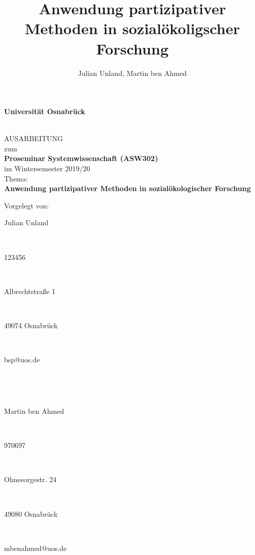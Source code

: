 \documentclass[a4paper, 12pt, DIV=11, listof=numbered, numbers=noenddot]{scrartcl}
\title{Anwendung partizipativer Methoden in sozialökoligscher Forschung}
\author{Julian Unland, Martin ben Ahmed}
\begin{document}
	
	
	\begin{titlepage}
		\begin{center}
			\vspace*{1.5cm}
			\begin{Large}
				\textbf{Universit\"at Osnabr\"uck}
			\end{Large}
			
			\noindent\hrulefill
			\\[3.5cm]
			AUSARBEITUNG \\[1cm]
			zum  \\[1cm]
			\textbf{Proseminar Systemwissenschaft (ASW302)} \\[1.5cm]    %
			im Wintersemester 2019/20 \\[1.5cm]   %
			Thema: \\[0.5cm]
			\textbf{Anwendung partizipativer Methoden in sozialökologischer Forschung} \\[2cm]        %
		
		\end{center}
		\vfill
		\begin{flushleft}
			Vorgelegt von: 
			\hfill \parbox{60mm}{Julian Unland} \\  %
			\hfill \parbox{60mm}{123456} \\
			\hfill \parbox{60mm}{Albrechtstraße 1} \\
			\hfill \parbox{60mm}{49074 Osnabrück} \\
			\hfill \parbox{60mm}{bsp@uos.de} \\
			\hfill \parbox{60mm}{} \\
			\hfill \parbox{60mm}{Martin ben Ahmed} \\  %
			\hfill \parbox{60mm}{970697} \\
			\hfill \parbox{60mm}{Ohnesorgestr. 24} \\
			\hfill \parbox{60mm}{49080 Osnabrück} \\
			\hfill \parbox{60mm}{mbenahmed@uos.de}
		\end{flushleft}
	\end{titlepage}
	
	
	\newpage
	\tableofcontents 
	
\end{document}
